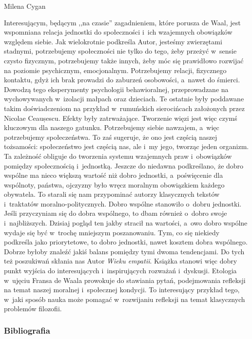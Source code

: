 \begin{recplenv}{Milena Cygan}
\enlargethispage{-.5\baselineskip}

Interesującym, będącym ,,na czasie'' zagadnieniem, które porusza de Waal, jest wspomniana relacja jednostki do
społeczności i~ich wzajemnych obowiązków względem siebie. Jak wielokrotnie podkreśla Autor, jesteśmy zwierzętami
stadnymi, potrzebujemy społeczności nie tylko do tego, żeby przeżyć w~sensie czysto fizycznym, potrzebujemy także innych,
żeby móc się prawidłowo rozwijać na poziomie psychicznym, emocjonalnym. Potrzebujemy relacji, fizycznego kontaktu, gdyż
ich brak prowadzi do zaburzeń osobowości, a~nawet do śmierci. Dowodzą tego eksperymenty psychologii behawioralnej,
przeprowadzane na wychowywanych w~izolacji małpach oraz dzieciach. Te ostatnie były poddawane takim doświadczeniom na
przykład w~rumuńskich sierocińcach założonych przez Nicolae Ceaușescu. Efekty były zatrważające. Tworzenie więzi
jest więc czymś kluczowym dla naszego gatunku. Potrzebujemy siebie nawzajem, a~więc potrzebujemy społeczeństwa. To zaś
sugeruje, że ono jest częścią naszej tożsamości: społeczeństwo jest częścią nas, ale i~my jego, tworząc jeden organizm.
Ta zależność obliguje do tworzenia systemu wzajemnych praw i~obowiązków pomiędzy społecznością i~jednostką. Jeszcze do
niedawna podkreślano, że dobro wspólne ma nieco większą wartość niż dobro jednostki, a~poświęcenie dla wspólnoty,
państwa, ojczyzny było wręcz moralnym obowiązkiem każdego obywatela. To starali się nam przypominać autorzy klasycznych
tekstów i~traktatów moralno-politycznych. Dobro wspólne stanowiło o~dobru jednostki. Jeśli przyczyniam się do dobra
wspólnego, to dbam również o~dobro swoje i~najbliższych. Dzisiaj pogląd ten jakby stracił na wartości, a~owo dobro
wspólne wydaje się być w~trochę mniejszym poszanowaniu. Tym, co się niekiedy podkreśla jako priorytetowe, to dobro
jednostki, nawet kosztem dobra wspólnego. Dobrze byłoby znaleźć jakiś balans pomiędzy tymi dwoma tendencjami. Do tych
też poszukiwań skłania nas Autor \textit{Wieku empatii}. Książka stanowi więc dobry punkt wyjścia do
interesujących i~inspirujących rozważań i~dyskusji. Etologia w~ujęciu Fransa de Waala prowokuje do stawiania pytań, podejmowania
refleksji na temat naszej moralnej i~społecznej kondycji. To interesujący przykład tego, w~jaki sposób nauka może
pomagać w~rozwijaniu refleksji na temat klasycznych problemów filozofii.





\subsubsection{Bibliografia}\nopagebreak[4]
\end{recplenv}
